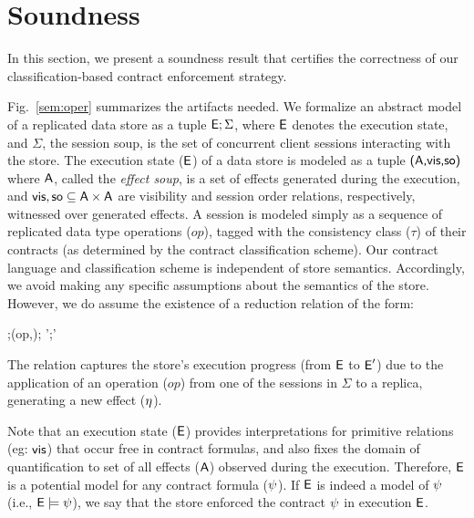 \section{Soundness}
\label{sec:core-opsem}

In this section, we present a soundness result that certifies
the correctness of our classification-based contract enforcement
strategy.

Fig.~\ref{sem:oper} summarizes the artifacts needed. We formalize an
abstract model of a replicated data store as a tuple ${\normalfont \textsf{E}};\Sigma$, where ${\normalfont \textsf{E}}$
denotes the execution state, and $\Sigma$, the session soup, is the set of
concurrent client sessions interacting with the store. The execution state
(${\normalfont \textsf{E}}$) of a data store is modeled as a tuple ${\normalfont \textsf{({\normalfont \textsf{A}},\allowbreak {\normalfont \textsf{vis}},\allowbreak {\normalfont \textsf{so}})}}$ where ${\normalfont \textsf{A}}$,
called the \emph{effect soup}, is a set of effects generated during the
execution, and ${\normalfont \textsf{vis}},{\normalfont \textsf{so}} \subseteq {\normalfont \textsf{A}} \times {\normalfont \textsf{A}}$ are
visibility and session order relations, respectively, witnessed over
generated effects. A session is modeled simply as a sequence of replicated
data type operations ($op$), tagged with the consistency class ($\tau$) of
their contracts (as determined by the contract classification scheme). Our
contract language and classification scheme is independent of store
semantics. Accordingly, we avoid making any specific assumptions about the
semantics of the store. However, we do assume the existence of a reduction
relation of the form:

\begin{smathpar}
  \auxred{} {\E;\langle (op,\tau);\sigma \rangle \pll \Sigma} {\eff} 
    {\E';\langle \sigma \rangle \pll \Sigma'}
\end{smathpar}

\noindent The relation captures the store's execution progress (from
${\normalfont \textsf{E}}$ to ${\normalfont \textsf{E}}'$) due to the application of an operation ($op$) from one
of the sessions in $\Sigma$ to a replica, generating a new effect
($\eta$).

Note that an execution state (${\normalfont \textsf{E}}$) provides interpretations for
primitive relations (eg: ${\normalfont \textsf{vis}}$) that occur free in contract
formulas, and also fixes the domain of quantification to set of all
effects (${\normalfont \textsf{A}}$) observed during the execution. Therefore, ${\normalfont \textsf{E}}$ is
a potential model for any contract formula ($\psi$). If ${\normalfont \textsf{E}}$ is indeed
a model of $\psi$ (i.e., ${\normalfont \textsf{E}} \models \psi$), we say that the store
enforced the contract $\psi$ in execution ${\normalfont \textsf{E}}$.

